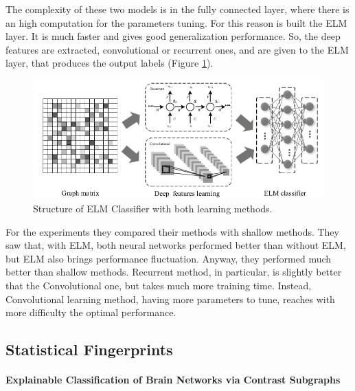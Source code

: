 The complexity of these two models is in the fully connected layer, where there is an high computation for the parameters tuning. For this reason is built the ELM layer. It is much faster and gives good generalization performance. So, the deep features are extracted, convolutional or recurrent ones, and are given to the ELM layer, that produces the output labels (Figure \ref{fig:diagram10}). 
\vspace{0.5cm}

\begin{figure}[htbp]
	\centering
	\includegraphics[scale=0.5]{Immagini/functional3.PNG}
	\caption{Structure of ELM Classifier with both learning methods.}
	\label{fig:diagram10}
\end{figure}

For the experiments they compared their methods with shallow methods. They saw that, with ELM, both neural networks performed better than without ELM, but ELM also brings performance fluctuation. Anyway, they performed much better than shallow methods. Recurrent method, in particular, is slightly better that the Convolutional one, but takes much more training time. Instead, Convolutional learning method, having more parameters to tune, reaches with more difficulty the optimal performance.

\subsection{Statistical Fingerprints}
\paragraph{Explainable Classification of Brain Networks via Contrast Subgraphs}\
\label{par:1}
\vspace{0.5cm}

